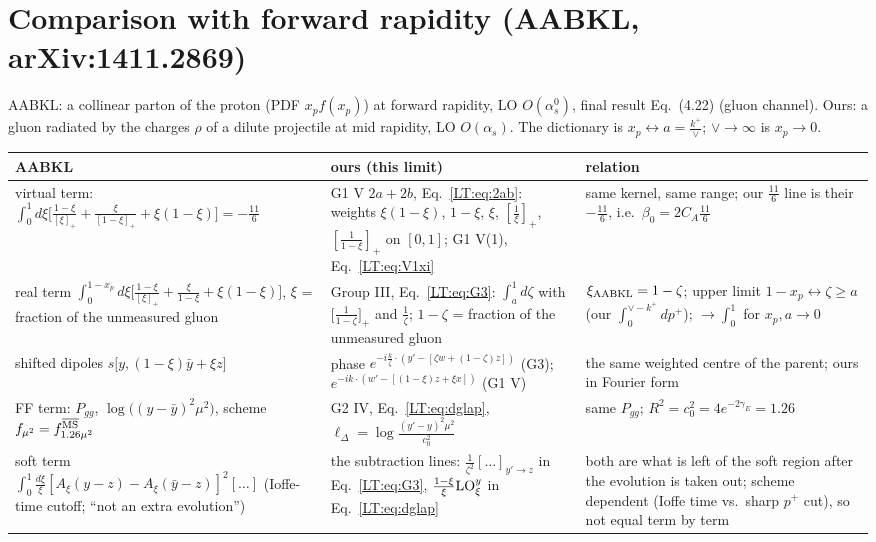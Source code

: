 \documentclass[10pt]{article}
\numberwithin{equation}{section}
\newcommand{\LO}{{\rm LO}}
\newcommand{\MSb}{\overline{\rm MS}}
\begin{document}
\section{Comparison with forward rapidity (AABKL, arXiv:1411.2869)}\label{LT:sec:aabkl}
AABKL: a collinear parton of the proton (PDF $x_pf(x_p)$) at forward rapidity, LO $O(\alpha_s^0)$, final result Eq.~(4.22) (gluon channel). Ours: a gluon radiated by the charges $\rho$ of a dilute projectile at mid rapidity, LO $O(\alpha_s)$. The dictionary is $x_p\leftrightarrow a=\frac{k^+}{\vee}$; $\vee\to\infty$ is $x_p\to0$.
{\small\renewcommand{\arraystretch}{1.35}
\begin{longtable}{@{}>{\raggedright\arraybackslash}p{}>{\raggedright\arraybackslash}p{}>{\raggedright\arraybackslash}p{}@{}}\toprule
AABKL & ours (this limit) & relation\\\midrule
virtual term: $\int_0^1d\xi\big[\frac{1-\xi}{[\xi]_+}+\frac{\xi}{[1-\xi]_+}+\xi(1-\xi)\big]=-\frac{11}{6}$ & G1 V $2a+2b$, Eq.~\eqref{LT:eq:2ab}: weights $\xi(1-\xi)$, $1-\xi$, $\xi$, $[\frac1\xi]_+$, $[\frac1{1-\xi}]_+$ on $[0,1]$; G1 V(1), Eq.~\eqref{LT:eq:V1xi} & same kernel, same range; our $\frac{11}{6}$ line is their $-\frac{11}{6}$, i.e.\ $\beta_0=2C_A\frac{11}{6}$\\
real term $\int_0^{1-x_p}d\xi\big[\frac{1-\xi}{[\xi]_+}+\frac{\xi}{1-\xi}+\xi(1-\xi)\big]$, $\xi$ = fraction of the unmeasured gluon & Group III, Eq.~\eqref{LT:eq:G3}: $\int_{a}^{1}d\zeta$ with $\big[\frac1{1-\zeta}\big]_+$ and $\frac1\zeta$; $1-\zeta$ = fraction of the unmeasured gluon & $\xi_{\rm AABKL}=1-\zeta$; upper limit $1-x_p\leftrightarrow\zeta\ge a$ (our $\int_0^{\vee-k^+}dp^+$); $\to\int_0^1$ for $x_p,a\to0$\\
shifted dipoles $s\big[y,(1-\xi)\bar y+\xi z\big]$ & phase $e^{-i\frac{k}{\zeta}\cdot(y'-[\zeta w+(1-\zeta)z])}$ (G3); $e^{-ik\cdot(w'-[(1-\xi)z+\xi x])}$ (G1 V) & the same weighted centre of the parent; ours in Fourier form\\
FF term: $P_{gg}$, $\log\big((y-\bar y)^2\mu^2\big)$, scheme $f_{\mu^2}=f^{\MSb}_{1.26\mu^2}$ & G2 IV, Eq.~\eqref{LT:eq:dglap}, $\ell_\Delta=\log\frac{(y'-y)^2\mu^2}{c_0^2}$ & same $P_{gg}$; $R^2=c_0^2=4e^{-2\gamma_E}=1.26$\\
soft term $\int_0^1\frac{d\xi}{\xi}[A_\xi(y-z)-A_\xi(\bar y-z)]^2[\dots]$ (Ioffe-time cutoff; ``not an extra evolution'') & the subtraction lines: $\frac{1}{\zeta^2}[\dots]_{y'\to z}$ in Eq.~\eqref{LT:eq:G3}, $\frac{1-\xi}{\xi}\LO^y_\xi$ in Eq.~\eqref{LT:eq:dglap} & both are what is left of the soft region after the evolution is taken out; scheme dependent (Ioffe time vs.\ sharp $p^+$ cut), so not equal term by term\\

\end{longtable}}
\end{document}
